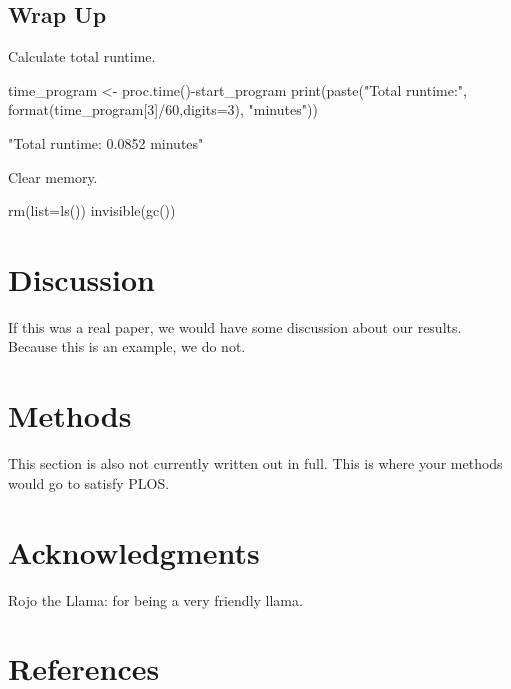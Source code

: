 \documentclass[10pt]{article}
\newenvironment{CodeChunk}{}{}
\begin{document}
\subsection*{Wrap Up}\label{wrap-up}

Calculate total runtime.

\begin{CodeChunk}
\begin{CodeInput}
time_program <- proc.time()-start_program
print(paste("Total runtime:", format(time_program[3]/60,digits=3), "minutes"))
\end{CodeInput}
\begin{CodeOutput}
[1] "Total runtime: 0.0852 minutes"
\end{CodeOutput}
\end{CodeChunk}

Clear memory.

\begin{CodeChunk}
\begin{CodeInput}
rm(list=ls())
invisible(gc())
\end{CodeInput}
\end{CodeChunk}

\section*{Discussion}\label{discussion}

If this was a real paper, we would have some discussion about our
results. Because this is an example, we do not.

\section*{Methods}\label{methods}

This section is also not currently written out in full. This is where
your methods would go to satisfy PLOS.

\section*{Acknowledgments}\label{acknowledgments}

Rojo the Llama: for being a very friendly llama.

\section*{References}\label{references}
\end{document}
